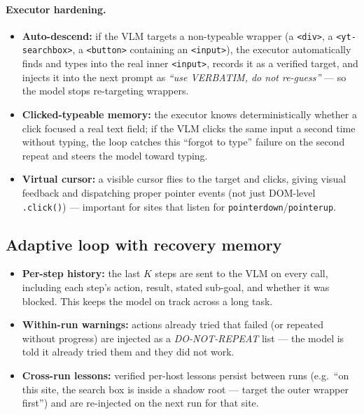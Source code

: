 \documentclass[11pt,a4paper]{article}
\newcommand{\code}[1]{\texttt{#1}}
\begin{document}
\paragraph{Executor hardening.}
\begin{itemize}
  \item \textbf{Auto-descend:} if the VLM targets a non-typeable wrapper (a \code{<div>}, a \code{<yt-searchbox>}, a \code{<button>} containing an \code{<input>}), the executor automatically finds and types into the real inner \code{<input>}, records it as a verified target, and injects it into the next prompt as \emph{``use VERBATIM, do not re-guess''} --- so the model stops re-targeting wrappers.
  \item \textbf{Clicked-typeable memory:} the executor knows deterministically whether a click focused a real text field; if the VLM clicks the same input a second time without typing, the loop catches this ``forgot to type'' failure on the second repeat and steers the model toward typing.
  \item \textbf{Virtual cursor:} a visible cursor flies to the target and clicks, giving visual feedback and dispatching proper pointer events (not just DOM-level \code{.click()}) --- important for sites that listen for \code{pointerdown}/\code{pointerup}.
\end{itemize}

\subsection{Adaptive loop with recovery memory}
\begin{itemize}
  \item \textbf{Per-step history:} the last $K$ steps are sent to the VLM on every call, including each step's action, result, stated sub-goal, and whether it was blocked. This keeps the model on track across a long task.
  \item \textbf{Within-run warnings:} actions already tried that failed (or repeated without progress) are injected as a \emph{DO-NOT-REPEAT} list --- the model is told it already tried them and they did not work.
  \item \textbf{Cross-run lessons:} verified per-host lessons persist between runs (e.g.\ ``on this site, the search box is inside a shadow root --- target the outer wrapper first'') and are re-injected on the next run for that site.
\end{itemize}
\end{document}
